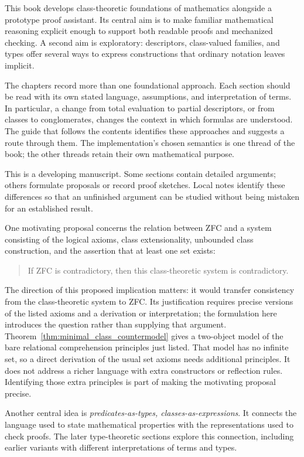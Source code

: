 This book develops class-theoretic foundations of mathematics alongside a
prototype proof assistant. Its central aim is to make familiar mathematical
reasoning explicit enough to support both readable proofs and mechanized
checking. A second aim is exploratory: descriptors, class-valued families,
and types offer several ways to express constructions that ordinary notation
leaves implicit.

The chapters record more than one foundational approach. Each section should
be read with its own stated language, assumptions, and interpretation of
terms. In particular, a change from total evaluation to partial descriptors,
or from classes to conglomerates, changes the context in which formulas are
understood. The guide that follows the contents identifies these approaches
and suggests a route through them. The implementation's chosen semantics is
one thread of the book; the other threads retain their own mathematical
purpose.

This is a developing manuscript. Some sections contain detailed arguments;
others formulate proposals or record proof sketches. Local notes identify
these differences so that an unfinished argument can be studied without
being mistaken for an established result.

One motivating proposal concerns the relation between ZFC and a system
consisting of the logical axioms, class extensionality, unbounded class
construction, and the assertion that at least one set exists:
\begin{quote}
If ZFC is contradictory, then this class-theoretic system is contradictory.
\end{quote}
The direction of this proposed implication matters: it would transfer
consistency from the class-theoretic system to ZFC. Its justification requires
precise versions of the listed axioms and a derivation or interpretation;
the formulation here introduces the question rather than supplying that
argument. Theorem~\ref{thm:minimal_class_countermodel} gives a two-object
model of the bare relational comprehension principles just listed. That
model has no infinite set, so a direct derivation of the usual set axioms
needs additional principles. It does not address a richer language with
extra constructors or reflection rules. Identifying those extra principles
is part of making the motivating proposal precise.

Another central idea is \emph{predicates-as-types, classes-as-expressions}.
It connects the language used to state mathematical properties with the
representations used to check proofs. The later type-theoretic sections
explore this connection, including earlier variants with different
interpretations of terms and types.

